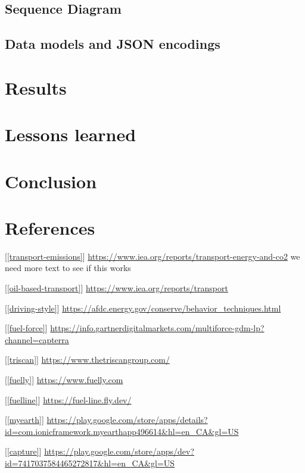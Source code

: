 \documentclass[11pt, oneside]{article}
\newcommand{\refinit}[1]{\noindent \hangindent=0.5cm [\ref{#1}]}  %
\begin{document}
\subsection{Sequence Diagram}

\subsection{Data models and JSON encodings}

\section{Results}

\section{Lessons learned}

\section{Conclusion}
 
 
\section{References}

\begin{small}

\refinit{transport-emissions} \url{https://www.iea.org/reports/transport-energy-and-co2} we need more text to see if this works

\refinit{oil-based-transport} \url{https://www.iea.org/reports/transport}

\refinit{driving-style} \url{https://afdc.energy.gov/conserve/behavior_techniques.html}

\refinit{fuel-force} \url{https://info.gartnerdigitalmarkets.com/multiforce-gdm-lp?channel=capterra}

\refinit{triscan} \url{https://www.thetriscangroup.com/}

\refinit{fuelly} \url{https://www.fuelly.com}

\refinit{fuelline} \url{https://fuel-line.fly.dev/}

\refinit{myearth} \url{https://play.google.com/store/apps/details?id=com.ionicframework.myearthapp496614&hl=en_CA&gl=US}

\refinit{capture} \url{https://play.google.com/store/apps/dev?id=7417037584465272817&hl=en_CA&gl=US}



\end{small}
\end{document}

